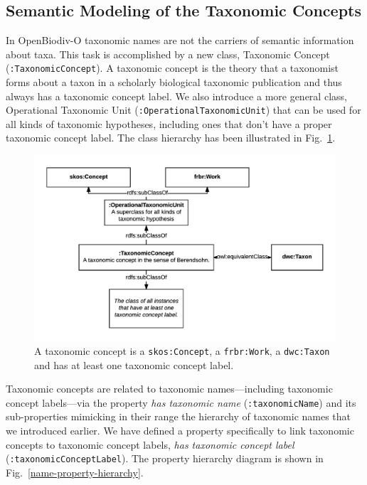 \subsection{Semantic Modeling of the Taxonomic Concepts}

In OpenBiodiv-O taxonomic names are not the carriers of semantic information about taxa. This task is accomplished by a new class, Taxonomic Concept ({\tt :TaxonomicConcept}). A taxonomic concept is the theory that a taxonomist forms about a taxon in a scholarly biological taxonomic publication and thus always has a taxonomic concept label. We also introduce a more general class, Operational Taxonomic Unit ({\tt :OperationalTaxonomicUnit}) that can be used for all kinds of taxonomic hypotheses, including ones that don't have a proper taxonomic concept label. The class hierarchy has been illustrated in Fig.~\ref{taxonomic-concept-diagram}.

\begin{figure}[h!]
\centering
  \includegraphics[width=\textwidth]{Figures/taxonomic-concept-diagram}
  \decoRule
  \caption[Taxonomic concept diagram.]{
  A taxonomic concept is a {\tt skos:Concept}, a {\tt frbr:Work}, a {\tt dwc:Taxon} and has at least one taxonomic concept label.}
  \label{taxonomic-concept-diagram}
\end{figure}

Taxonomic concepts are related to taxonomic names---including taxonomic concept labels---via the property \emph{has taxonomic name} ({\tt :taxonomicName}) and its sub-properties mimicking in their range the hierarchy of taxonomic names that we introduced earlier. We have defined a property specifically to link taxonomic concepts to taxonomic concept labels, \emph{has taxonomic concept label} ({\tt :taxonomicConceptLabel}). The property hierarchy diagram is shown in Fig.~\ref{name-property-hierarchy}.

